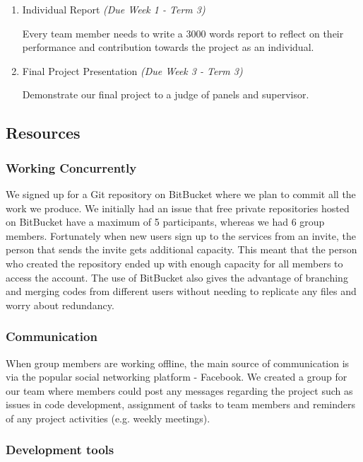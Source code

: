 \begin{enumerate}
    \item Individual Report \emph{(Due Week 1 - Term 3)}
    
	Every team member needs to write a 3000 words report to reflect on their performance and contribution towards the project as an individual.
    
    \item Final Project Presentation \emph{(Due Week 3 - Term 3)}
    
    Demonstrate our final project to a judge of panels and supervisor.
 
\end{enumerate}

\subsection{Resources}

\subsubsection{Working Concurrently}

We signed up for a Git repository on BitBucket \cite{bitbucket} where we plan to commit all the work we produce. We initially had an issue that free private repositories hosted on BitBucket have a maximum of 5 participants, whereas we had 6 group members. Fortunately when new users sign up to the services from an invite, the person that sends the invite gets additional capacity. This meant that the person who created the repository ended up with enough capacity for all members to access the account. The use of BitBucket also gives the advantage of branching and merging codes from different users without needing to replicate any files and worry about redundancy. 

\subsubsection{Communication}

When group members are working offline, the main source of communication is via the popular social networking platform - Facebook. We created a group for our team where members could post any messages regarding the project such as issues in code development, assignment of tasks to team members and reminders of any project activities (e.g. weekly meetings).

\subsubsection{Development tools}

